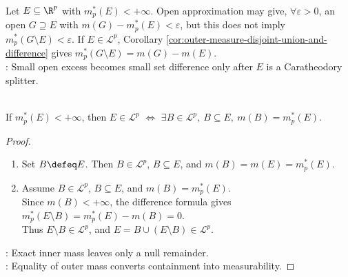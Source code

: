 \begin{remark} \label{rem:excision-needs-measurability} \\
Let $E\subseteq\R^p$ with $m_p^\ast(E)<+\infty$. Open approximation may give, $\forall \varepsilon>0$, an open $G\supseteq E$ with $m(G)-m_p^\ast(E)<\varepsilon$, but this does not imply $m_p^\ast(G\setminus E)<\varepsilon$. If $E\in\mathcal{L}^p$, Corollary \ref{cor:outer-measure-disjoint-union-and-difference} gives $m_p^\ast(G\setminus E)=m(G)-m(E)$.\\
: Small open excess becomes small set difference only after $E$ is a Caratheodory splitter.
\end{remark}

\begin{theorem} \label{thm:finite-outer-measure-inner-measurable-subset-test} \\
If $m_p^\ast(E)<+\infty$, then $E\in\mathcal{L}^p$ $\Longleftrightarrow$ $\exists B\in\mathcal{L}^p,\ B\subseteq E,\ m(B)=m_p^\ast(E)$.
\begin{proof}
\begin{enumerate}[label=\roman*.]
\setlength{\itemsep}{0pt}
\item[$(\Rightarrow)$] Set $B\defeq E$. Then $B\in\mathcal{L}^p$, $B\subseteq E$, and $m(B)=m(E)=m_p^\ast(E)$.
\item[$(\Leftarrow)$] Assume $B\in\mathcal{L}^p$, $B\subseteq E$, and $m(B)=m_p^\ast(E)$.\\
Since $m(B)<+\infty$, the difference formula gives $m_p^\ast(E\setminus B)=m_p^\ast(E)-m(B)=0$.\\
Thus $E\setminus B\in\mathcal{L}^p$, and $E=B\cup(E\setminus B)\in\mathcal{L}^p$.
\end{enumerate}
: Exact inner mass leaves only a null remainder.\\
: Equality of outer mass converts containment into measurability.
\end{proof}
\end{theorem}

